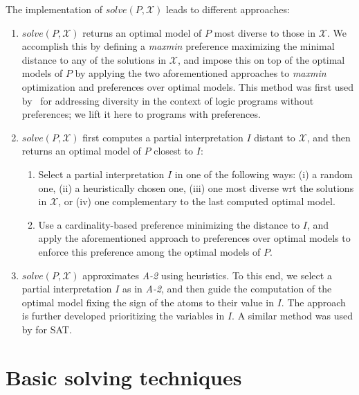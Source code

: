 \documentclass[a4paper,UKenglish]{oasics}
\begin{document}
%
The implementation of $\mathit{solve}(P,\mathcal{X})$ leads to different approaches:
%
\begin{enumerate}[label={\textcolor{darkgray}{\sffamily\bfseries\mathversion{bold}{A-\arabic*}}}.]
\item $\mathit{solve}(P,\mathcal{X})$ returns an optimal model of $P$ most diverse to those in $\mathcal{X}$.
%
  We accomplish this by defining a \textit{maxmin} preference maximizing the minimal distance to any of the solutions in $\mathcal{X}$,
  and impose this on top of the optimal models of $P$ 
  by applying the two aforementioned approaches to \emph{maxmin} optimization and preferences over optimal models.
  This method was first used by~\cite{eiererfi13a} for addressing diversity in the context of logic programs without preferences;
  we lift it here to programs with preferences.
  
\item $\mathit{solve}(P,\mathcal{X})$ first computes a partial interpretation $I$ distant to $\mathcal{X}$, 
  and then returns an optimal model of $P$ closest to $I$:
  \begin{enumerate}
  \item Select a partial interpretation $I$ in one of the following ways:
%
(i) %
    a random one,
(ii) %
    a heuristically chosen one, %
(iii) %
    one most diverse wrt the solutions in $\mathcal{X}$, or 
(iv) %
    one complementary to the last computed optimal model.%
%
  \item Use a cardinality-based preference minimizing the distance to $I$, and
    apply the aforementioned approach to preferences over optimal models to enforce this preference among the optimal models of $P$.
  \end{enumerate}
  
\item $\mathit{solve}(P,\mathcal{X})$ approximates \emph{A-2} using heuristics. %
  To this end, we select a partial interpretation $I$ as in \emph{A-2}, 
  and then guide the computation of the optimal model fixing the sign of the atoms to their value in $I$. 
  The approach is further developed prioritizing the variables in $I$.
  A similar method was used by \cite{nadel11a} for SAT.
\end{enumerate}

%
%
%
%

\section{Basic solving techniques}\label{sec:basic}
%
\makeatletter{}%
%
%
%
%
%
%
%
%
\end{document}
